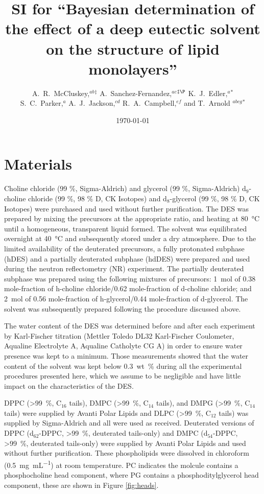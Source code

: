 \documentclass[11pt,a4paper]{paper}
\title{SI for ``Bayesian determination of the effect of a deep eutectic solvent on the structure of lipid monolayers''}
\author{A.~R.~McCluskey,\textit{$^{ab}$}$^{\ddag}$ A.~Sanchez-Fernandez,\textit{$^{ac}$}$^{\ddag\P}$ K.~J.~Edler,\textit{$^{a}$}$^{\ast}$ \\
S.~C.~Parker,\textit{$^{a}$} A.~J.~Jackson,\textit{$^{cd}$} R.~A.~Campbell,\textit{$^{ef}$} and T.~Arnold \textit{$^{abcg}$}$^{\ast}$}
\date{\today}
\begin{document}
\maketitle

\section{Materials}
Choline chloride (99 \%, Sigma-Aldrich) and glycerol (99 \%, Sigma-Aldrich) d$_9$-choline chloride (99 \%, 98 \% D, CK Isotopes) and d$_8$-glycerol (99 \%, 98 \% D, CK Isotopes)  were purchased and used without further purification. The DES was prepared by mixing the precursors at the appropriate ratio, and heating at \SI{80}{\celsius} until a homogeneous, transparent liquid formed.\cite{Smith2014} The solvent was equilibrated overnight at \SI{40}{\celsius} and subsequently stored under a dry atmosphere. Due to the limited availability of the deuterated precursors, a fully protonated subphase (hDES) and a partially deuterated subphase (hdDES) were prepared and used during the neutron reflectometry (NR) experiment. The partially deuterated subphase was prepared using the following mixtures of precursors: \SI{1}{\mole} of 0.38 mole-fraction of h-choline chloride/0.62 mole-fraction of d-choline chloride; and \SI{2}{\mole} of 0.56 mole-fraction of h-glycerol/0.44 mole-fraction of d-glycerol. The solvent was subsequently prepared following the procedure discussed above.

The water content of the DES was determined before and after each experiment by Karl-Fischer titration (Mettler Toledo DL32 Karl-Fischer Coulometer, Aqualine Electrolyte A, Aqualine Catholyte CG A) in order to ensure water presence was kept to a minimum. Those measurements showed that the water content of the solvent was kept below \SI{0.3}{wt\percent} during all the experimental procedures presented here, which we assume to be negligible and have little impact on the characteristics of the DES.\cite{Hammond2016,Hammond2017}

DPPC (\SI{>99}{\percent}, C$_{16}$ tails), DMPC (\SI{>99}{\percent}, C$_{14}$ tails), and DMPG (\SI{>99}{\percent}, C$_{14}$ tails) were supplied by Avanti Polar Lipids and DLPC (\SI{>99}{\percent}, C$_{12}$ tails) was supplied by Sigma-Aldrich and all were used as received. Deuterated versions of DPPC (d$_{62}$-DPPC, \SI{>99}{\percent}, deuterated tails-only) and DMPC (d$_{54}$-DPPC, \SI{>99}{\percent}, deuterated tails-only) were supplied by Avanti Polar Lipids and used without further purification. These phospholipids were dissolved in chloroform (\SI{0.5}{\milli\gram\per\milli\liter}) at room temperature. PC indicates the molcule contains a phosphocholine head component, where PG contains a phosphoditylglycerol head component, these are shown in Figure \ref{fig:heads}.
\end{document}
